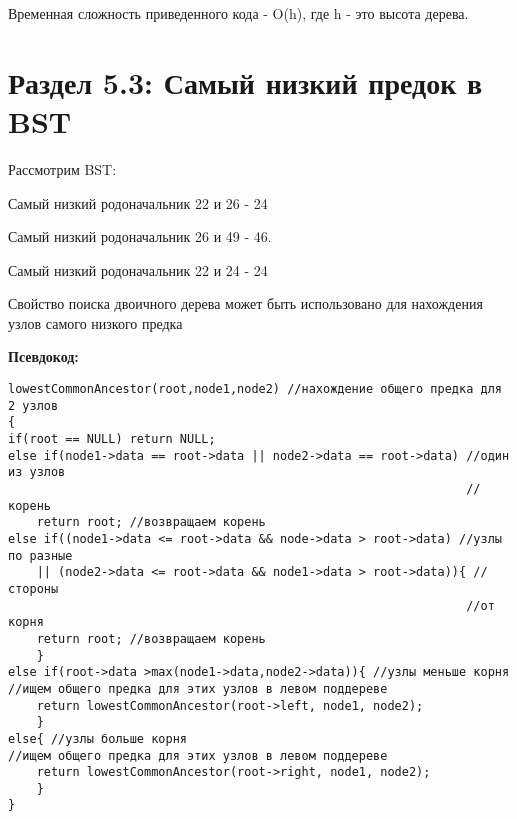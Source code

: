 \vspace{\baselineskip}
Временная сложность приведенного кода - O(h), где h - это высота дерева.

\vspace{\baselineskip}
\section*{Раздел 5.3: Самый низкий предок в BST}

\vspace{\baselineskip}
Рассмотрим BST:


\vspace{\baselineskip}
Самый низкий родоначальник 22 и 26 - 24

\vspace{\baselineskip}
Самый низкий родоначальник 26 и 49 - 46.

\vspace{\baselineskip}
Самый низкий родоначальник 22 и 24 - 24

\vspace{\baselineskip}
Свойство поиска двоичного дерева может быть использовано для нахождения узлов самого низкого предка

\vspace{\baselineskip}
{\bfseries Псевдокод:}

\vspace{\baselineskip}
\begin{tcolorbox}
\begin{verbatim}
lowestCommonAncestor(root,node1,node2) //нахождение общего предка для 2 узлов
{
if(root == NULL) return NULL;
else if(node1->data == root->data || node2->data == root->data) //один из узлов
																//корень
	return root; //возвращаем корень
else if((node1->data <= root->data && node->data > root->data) //узлы по разные
	|| (node2->data <= root->data && node1->data > root->data)){ //стороны 
																//от корня
	return root; //возвращаем корень
	}
else if(root->data >max(node1->data,node2->data)){ //узлы меньше корня
//ищем общего предка для этих узлов в левом поддереве
	return lowestCommonAncestor(root->left, node1, node2); 
	}
else{ //узлы больше корня
//ищем общего предка для этих узлов в левом поддереве
	return lowestCommonAncestor(root->right, node1, node2);		
	}
}
\end{verbatim}
\end{tcolorbox}

\vspace{\baselineskip}
